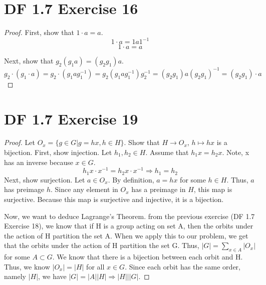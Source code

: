 \documentclass{article}
\begin{document}
\section{DF 1.7 Exercise 16}
\begin{proof}
First, show that $1 \cdot a = a$.
\[
1 \cdot a = 1a1^{-1}
\]
\[
1 \cdot a = a
\]

Next, show that $g_2(g_1a)=(g_2g_1)a$.
\[
g_2\cdot(g_1 \cdot a) = g_2\cdot(g_1ag_1^{-1}) = g_2(g_1ag_1^{-1}) g_2^{-1} =
(g_2g_1)a(g_2g_1)^{-1} = (g_2g_1)\cdot a
\]
\end{proof}

\section{DF 1.7 Exercise 19}
\begin{proof}
Let $O_x = \{g \in G | g = hx, h \in H\}$. Show that $H \rightarrow O_x$, $h \mapsto hx$ is a bijection. First, show injection. Let $h_1, h_2 \in H$. Assume that $h_1x = h_2x$. Note, x has an inverse because $x \in G$.
\[
h_1x \cdot x^{-1} = h_2x \cdot x^{-1} \Rightarrow h_1 = h_2
\]
Next, show surjection. Let $a \in O_x$. By definition, $a = hx$ for some $h \in H$. Thus, $a$ has preimage $h$. Since any element in $O_x$ has a preimage in $H$, this map is surjective. Because this map is surjective and injective, it is a bijection.

Now, we want to deduce Lagrange's Theorem. from the previous exercise (DF 1.7 Exercise 18), we know that if H is a group acting on set A, then the orbits under the action of H partition the set A. When we apply this to our problem, we get that the orbits under the action of H partition the set G. Thus, $|G|=\sum_{x\in A} |O_x|$ for some $A \subset G$. We know that there is a bijection between each orbit and H. Thus, we know $|O_x|=|H|$ for all $x\in G$. Since each orbit has the same order, namely $|H|$, we have $|G|=|A||H| \Rightarrow |H| | |G|$. 
\end{proof}
\end{document}
